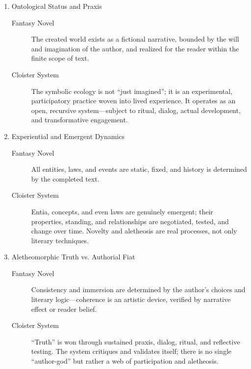 \begin{enumerate}
  \item Ontological Status and Praxis
  \begin{description}

    \item[Fantasy Novel] The created world exists as a fictional narrative,
      bounded by the will and imagination of the author, and realized for the
      reader within the finite scope of text.

    \item[Cloister System] The symbolic ecology is not “just imagined”; it is
      an experimental, participatory practice woven into lived experience. It
      operates as an open, recursive system—subject to ritual, dialog, actual
      development, and transformative engagement.

  \end{description}

  \item Experiential and Emergent Dynamics
  \begin{description}

    \item[Fantasy Novel] All entities, laws, and events are static, fixed, and
      history is determined by the completed text.

    \item[Cloister System] Entia, concepts, and even laws are genuinely
      emergent; their properties, standing, and relationships are negotiated,
      tested, and change over time. Novelty and aletheosis are real processes,
      not only literary techniques.

  \end{description}

  \item Aletheomorphic Truth vs. Authorial Fiat
  \begin{description}

    \item[Fantasy Novel] Consistency and immersion are determined by the
      author’s choices and literary logic—coherence is an artistic device,
      verified by narrative effect or reader belief.

    \item[Cloister System] “Truth” is won through sustained praxis, dialog,
      ritual, and reflective testing. The system critiques and validates
      itself; there is no single “author-god” but rather a web of participation
      and aletheosis.


\end{description}
\end{enumerate}
